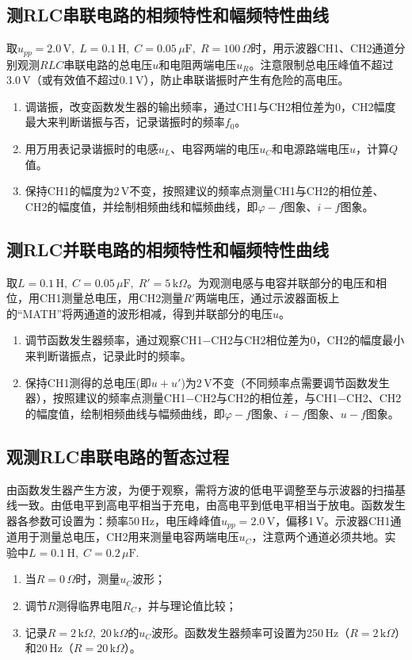 \documentclass[12pt]{article}
\begin{document}
\subsection{测RLC串联电路的相频特性和幅频特性曲线}
取$ u_{pp}=2.0\,\mathrm V,\;L=0.1\,\mathrm H,\;C=0.05\,\mu\mathrm F,\;R=100\,\Omega $时，用示波器CH1、CH2通道分别观测$ RLC $串联电路的总电压$ u $和电阻两端电压$ u_R $。注意限制总电压峰值不超过$ 3.0\,\mathrm V $（或有效值不超过0.1\,V），防止串联谐振时产生有危险的高电压。

\begin{enumerate}
    \item 调谐振，改变函数发生器的输出频率，通过CH1与CH2相位差为0，CH2幅度最大来判断谐振与否，记录谐振时的频率$ f_0 $。
    \item 用万用表记录谐振时的电感$ u_L $、电容两端的电压$ u_C $和电源路端电压$ u $，计算$ Q $值。
    \item 保持CH1的幅度为$ 2\,\mathrm V $不变，按照建议的频率点测量CH1与CH2的相位差、CH2的幅度值，并绘制相频曲线和幅频曲线，即$ \varphi-f $图象、$ i-f $图象。
\end{enumerate}

\subsection{测RLC并联电路的相频特性和幅频特性曲线}
取$L=0.1\,\mathrm H,\;C=0.05\,\mu\mathrm F,\;R'=5\,\mathrm k\Omega $。为观测电感与电容并联部分的电压和相位，用CH1测量总电压，用CH2测量$ R' $两端电压，通过示波器面板上的“MATH”将两通道的波形相减，得到并联部分的电压$ u $。
\begin{enumerate}	
	\item 调节函数发生器频率，通过观察CH1$ - $CH2与CH2相位差为0，CH2的幅度最小来判断谐振点，记录此时的频率。
	
	\item 保持CH1测得的总电压(即$u+u'$)为2\,V不变（不同频率点需要调节函数发生器），按照建议的频率点测量CH1$ - $CH2与CH2的相位差，与CH1$ - $CH2、CH2的幅度值，绘制相频曲线与幅频曲线，即$ \varphi-f $图象、$ i-f $图象、$ u-f $图象。
\end{enumerate}

\subsection{观测RLC串联电路的暂态过程}
由函数发生器产生方波，为便于观察，需将方波的低电平调整至与示波器的扫描基线一致。由低电平到高电平相当于充电，由高电平到低电平相当于放电。函数发生器各参数可设置为：频率50\,Hz，电压峰峰值$ u_{pp}=2.0\,\mathrm V $，偏移1\,V。示波器CH1通道用于测量总电压，CH2用来测量电容两端电压$ u_C $，注意两个通道必须共地。实验中$ L=0.1\,\mathrm H,\;C=0.2\,\mu\mathrm F $.
\begin{enumerate}
	\item 当$ R=0\,\Omega $时，测量$ u_C $波形；
	
	\item 调节$ R $测得临界电阻$ R_C $，并与理论值比较；
	
	\item 记录$ R=2\,\mathrm{k}\Omega,\;20\,\mathrm k\Omega $的$ u_C $波形。函数发生器频率可设置为250\,Hz（$ R=2\,\mathrm k\Omega $）和20\,Hz（$ R=20\,\mathrm k\Omega $）。
\end{enumerate}
\end{document}
